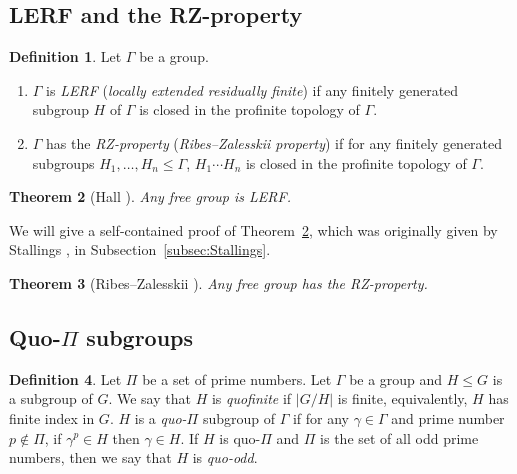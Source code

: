 \documentclass[10pt,a4paper]{amsart}
\newtheorem{theorem}{Theorem}[section]
\theoremstyle{definition}
\newtheorem{definition}[theorem]{Definition}
\theoremstyle{definition}
\numberwithin{equation}{section}
\begin{document}







\subsection{LERF and the RZ-property}

\begin{definition} Let $\Gamma$ be a group.
\begin{enumerate}
\item[(i)] $\Gamma$ is {\em LERF} ({\em locally extended residually finite}) if any finitely generated subgroup $H$ of $\Gamma$ is closed in the profinite topology of $\Gamma$.
\item[(ii)] $\Gamma$ has the {\em RZ-property} ({\em Ribes--Zalesskii property}) if for any finitely generated subgroups $H_1,\dots, H_n\leq \Gamma$, $H_1\cdots H_n$ is closed in the profinite topology of $\Gamma$.
\end{enumerate}
\end{definition}

\begin{theorem}[Hall \cite{Ha49}]\label{thm:Hall} Any free group is LERF.
\end{theorem}

We will give a self-contained proof of Theorem~\ref{thm:Hall}, which was originally given by Stallings \cite{St83}, in Subsection~\ref{subsec:Stallings}.

\begin{theorem}[Ribes--Zalesskii \cite{RZ93}] Any free group has the RZ-property.
\end{theorem}





\subsection{Quo-$\Pi$ subgroups}

\begin{definition} Let $\Pi$ be a set of prime numbers. Let $\Gamma$ be a group and $H\leq G$ is a subgroup of $G$. We say that $H$ is {\em quofinite} if $|G/H|$ is finite, equivalently, $H$ has finite index in $G$.
$H$ is a {\em quo-$\Pi$} subgroup of $\Gamma$ if for any $\gamma\in \Gamma$ and prime number $p\not\in \Pi$, if $\gamma^p\in H$ then $\gamma\in H$. If $H$ is quo-$\Pi$ and $\Pi$ is the set of all odd prime numbers, then we say that $H$ is {\em quo-odd}.
\end{definition}
\end{document}
